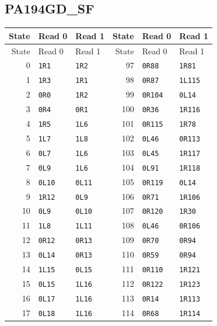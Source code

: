 \subsection{PA194GD\_SF}
\begingroup\small
\begin{longtable}{@{}rll@{\hspace{2em}}rll@{}}
\toprule State & Read 0 & Read 1 & State & Read 0 & Read 1\\\midrule\endfirsthead
\toprule State & Read 0 & Read 1 & State & Read 0 & Read 1\\\midrule\endhead
0 & \texttt{1R1} & \texttt{1R2} & 97 & \texttt{0R88} & \texttt{1R81}\\
1 & \texttt{1R3} & \texttt{1R1} & 98 & \texttt{0R87} & \texttt{1L115}\\
2 & \texttt{0R0} & \texttt{1R2} & 99 & \texttt{0R104} & \texttt{0L14}\\
3 & \texttt{0R4} & \texttt{0R1} & 100 & \texttt{0R36} & \texttt{1R116}\\
4 & \texttt{1R5} & \texttt{1L6} & 101 & \texttt{0R115} & \texttt{1R78}\\
5 & \texttt{1L7} & \texttt{1L8} & 102 & \texttt{0L46} & \texttt{0R113}\\
6 & \texttt{0L7} & \texttt{1L6} & 103 & \texttt{0L45} & \texttt{1R117}\\
7 & \texttt{0L9} & \texttt{1L6} & 104 & \texttt{0L91} & \texttt{1R118}\\
8 & \texttt{0L10} & \texttt{0L11} & 105 & \texttt{0R119} & \texttt{0L14}\\
9 & \texttt{1R12} & \texttt{0L9} & 106 & \texttt{0R71} & \texttt{1R106}\\
10 & \texttt{0L9} & \texttt{0L10} & 107 & \texttt{0R120} & \texttt{1R30}\\
11 & \texttt{1L8} & \texttt{1L11} & 108 & \texttt{0L46} & \texttt{0R106}\\
12 & \texttt{0R12} & \texttt{0R13} & 109 & \texttt{0R70} & \texttt{0R94}\\
13 & \texttt{0L14} & \texttt{0R13} & 110 & \texttt{0R59} & \texttt{0R94}\\
14 & \texttt{1L15} & \texttt{0L15} & 111 & \texttt{0R110} & \texttt{1R121}\\
15 & \texttt{0L15} & \texttt{1L16} & 112 & \texttt{0R122} & \texttt{1R123}\\
16 & \texttt{0L17} & \texttt{1L16} & 113 & \texttt{0R14} & \texttt{1R113}\\
17 & \texttt{0L18} & \texttt{1L16} & 114 & \texttt{0R68} & \texttt{1R114}\\

\end{longtable}
